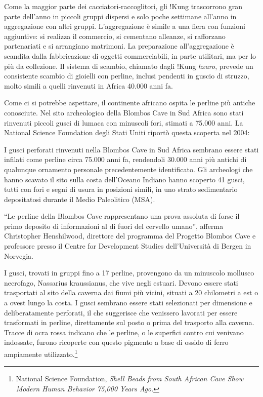 \documentclass[
  a5paper,
  smalldemyvopaper,10pt,twoside,onecolumn,openright,extrafontsizes,hidelinks]{memoir}
\renewenvironment{quote}%
               {\list{}{\rightmargin=.6cm\leftmargin=.6cm}%
                \itshape \item[]}%
               {\endlist}
\begin{document}
Come la maggior parte dei cacciatori-raccoglitori, gli !Kung trascorrono
gran parte dell'anno in piccoli gruppi dispersi e solo poche settimane
all'anno in aggregazione con altri gruppi. L'aggregazione è simile a una
fiera con funzioni aggiuntive: si realizza il commercio, si cementano
alleanze, si rafforzano partenariati e si arrangiano matrimoni. La
preparazione all'aggregazione è scandita dalla fabbricazione di oggetti
commerciabili, in parte utilitari, ma per lo più da collezione. Il
sistema di scambio, chiamato dagli !Kung \emph{hxaro}, prevede un
consistente scambio di gioielli con perline, inclusi pendenti in guscio
di struzzo, molto simili a quelli rinvenuti in Africa 40.000 anni fa.

Come ci si potrebbe aspettare, il continente africano ospita le perline
più antiche conosciute. Nel sito archeologico della Blombos Cave in Sud
Africa sono stati rinvenuti piccoli gusci di lumaca con minuscoli fori,
stimati a 75.000 anni. La National Science Foundation degli Stati Uniti
riportò questa scoperta nel 2004:

\begin{quote}
I gusci perforati rinvenuti nella Blombos Cave in Sud Africa sembrano
essere stati infilati come perline circa 75.000 anni fa, rendendoli
30.000 anni più antichi di qualunque ornamento personale precedentemente
identificato. Gli archeologi che hanno scavato il sito sulla costa
dell'Oceano Indiano hanno scoperto 41 gusci, tutti con fori e segni di
usura in posizioni simili, in uno strato sedimentario depositatosi
durante il Medio Paleolitico (MSA).
\end{quote}

\begin{quote}
``Le perline della Blombos Cave rappresentano una prova assoluta di
forse il primo deposito di informazioni al di fuori del cervello
umano'', afferma Christopher Henshilwood, direttore del programma del
Progetto Blombos Cave e professore presso il Centre for Development
Studies dell'Università di Bergen in Norvegia.
\end{quote}

\begin{quote}
I gusci, trovati in gruppi fino a 17 perline, provengono da un minuscolo
mollusco necrofago, Nassarius kraussianus, che vive negli estuari.
Devono essere stati trasportati al sito della caverna dai fiumi più
vicini, situati a 20 chilometri a est o a ovest lungo la costa. I gusci
sembrano essere stati selezionati per dimensione e deliberatamente
perforati, il che suggerisce che venissero lavorati per essere
trasformati in perline, direttamente sul posto o prima del trasporto
alla caverna. Tracce di ocra rossa indicano che le perline, o le
superfici contro cui venivano indossate, furono ricoperte con questo
pigmento a base di ossido di ferro ampiamente utilizzato.\footnote{National
  Science Foundation, \emph{Shell Beads from South African Cave Show
  Modern Human Behavior 75,000 Years Ago}.}
\end{quote}
\end{document}
